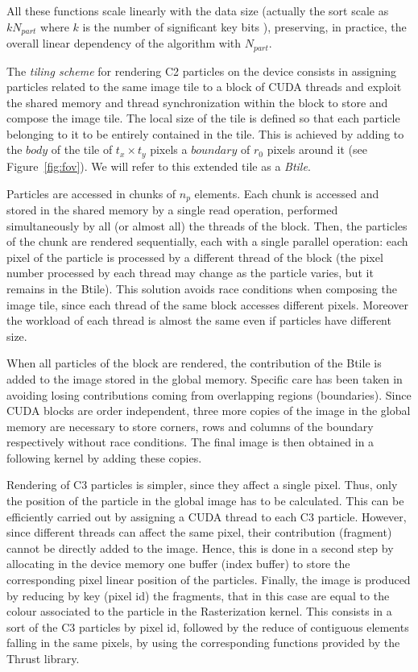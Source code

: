 \documentclass[1p]{elsarticle}
\begin{document}
All these functions scale linearly with the data size (actually the sort scale 
as $kN_{part}$ where $k$ is the number of significant key bits \cite{RadixSort}),
preserving, in practice, the overall linear dependency of the algorithm with $N_{part}$.

The \textit{tiling scheme} for rendering C2 particles on the device consists in 
assigning particles related to the same image tile to a block of CUDA threads 
and exploit the shared memory and thread synchronization within the block to store 
and compose the image tile. The local size of the tile is defined so that each particle 
belonging to it to be entirely contained in the tile. This is achieved by 
adding to the $body$ of the tile of $t_x \times t_y$ pixels a $boundary$ of $r_0$ pixels around it (see Figure~\ref{fig:fov}). We will refer to this extended tile as a \textit{Btile}.

Particles are accessed in chunks of $n_p$ elements. Each chunk is accessed and stored 
in the shared memory by a single read operation, performed simultaneously by all (or almost all) the threads of the block. Then, the particles of the chunk are rendered sequentially, each with a single parallel operation: each pixel of the particle is processed by a different thread of the block (the pixel number processed by each thread may change as the particle varies, but it remains in the Btile). 
This solution avoids race conditions when composing the image tile, since each 
thread of the same block accesses different pixels. Moreover the workload of each 
thread is almost the same even if particles have different size.

When all particles of the block are rendered, the contribution of the Btile 
is added to the image stored in the global memory. 
Specific care has been taken in avoiding losing contributions coming 
from overlapping regions (boundaries). Since CUDA blocks are order independent, three more copies of the image in the global memory are necessary to store corners, rows and columns of the boundary respectively without race conditions. The final image is then obtained in a following kernel by adding these copies.

Rendering of C3 particles is simpler, since they affect a single pixel. 
Thus, only the position of the particle in the global image has to be calculated.
This can be efficiently carried out by assigning a CUDA thread to each C3 particle. 
However, since different threads can affect the same pixel, their contribution (fragment) cannot be directly added to the image. Hence, this is done in a second step by allocating in the device memory one buffer (index buffer) to store the corresponding pixel linear position of the particles. Finally, the image is produced by reducing by key (pixel id) the fragments, that in this case are equal to the colour associated to the particle in the Rasterization kernel. This consists in a sort of the C3 particles by pixel id, followed by the reduce of 
contiguous elements falling in the same pixels, by using the corresponding 
functions provided by the Thrust library.
\end{document}
